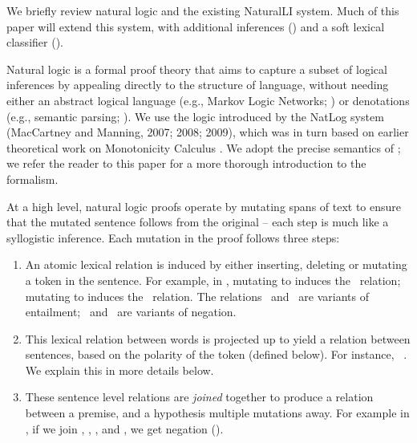 We briefly review natural logic and the existing NaturalLI system.
Much of this paper will extend this system, with additional inferences
  () and a soft lexical classifier ().

Natural logic is a formal proof theory that 
  aims to capture a subset of logical
  inferences by appealing directly to the structure of language,
  without needing either an abstract logical language 
  (e.g., Markov Logic Networks; )
  or denotations (e.g., semantic parsing; ).
We use the logic
  introduced by the NatLog system (MacCartney and Manning, 2007; 2008; 2009),
  \nocite{key:2007maccartney-natlog}
  \nocite{key:2008maccartney-natlog}
  \nocite{key:2009maccartney-natlog} %
  which was in turn
  based on earlier theoretical work on Monotonicity Calculus
  \cite{key:1986benthem-natlog,key:1991valencia-natlog}.
We adopt the precise semantics of ;
  we refer the reader to this paper for a more thorough introduction to
  the formalism.

At a high level, natural logic proofs operate by mutating spans of text
  to ensure that the mutated sentence follows from the
  original -- each step is much like a syllogistic inference.
Each mutation in the proof follows three steps:

\begin{enumerate}
\setlength\itemsep{-0.25em}
\item An atomic lexical relation is induced by either inserting, deleting
      or mutating a token in the sentence. 
      For example, in ,
      mutating  to  induces the \negate\ relation;
      mutating  to  induces the \forward\ relation.
      The relations \equivalent\ and \forward\ are variants of  entailment;
      \negate\ and \alternate\ are variants of negation.

\item This lexical relation between words is projected up to yield a relation between
      sentences, based on the polarity of the token (defined below).
      For instance,  \forward\ .
      We explain this in more details below.

\item These sentence level relations are \textit{joined} together to produce a
      relation between a premise, and a hypothesis multiple mutations away.
      For example in , if we join 
      \forward, \equivalent, \forward, and \negate, we
      get negation (\alternate).
\end{enumerate}

